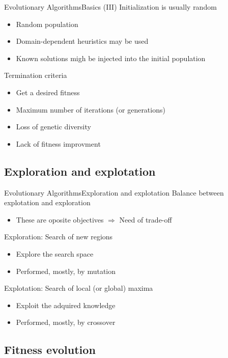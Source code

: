 \documentclass[10pt,compress]{beamer} %
\begin{document}
\begin{frame}{Evolutionary Algorithms}{Basics (III)}
	Initialization is usually random
	\begin{itemize}
		\item Random population
		\item Domain-dependent heuristics may be used
		\item Known solutions migh be injected into the initial population
	\end{itemize}
	Termination criteria
	\begin{itemize}
		\item Get a desired fitness
		\item Maximum number of iterations (or generations)
		\item Loss of genetic diversity
		\item Lack of fitness improvment
	\end{itemize}
\end{frame}

\subsection{Exploration and explotation}
\begin{frame}{Evolutionary Algorithms}{Exploration and explotation} 
	Balance between \alert{explotation} and \alert{exploration}
        \begin{itemize}
	    \item These are oposite objectives $\Rightarrow$ Need of trade-off
        \end{itemize}
	Exploration: Search of new regions%
		\begin{itemize}
		\item Explore the search space
		\item Performed, mostly, by mutation
		\end{itemize}
	Explotation: Search of local (or global) maxima%
		\begin{itemize}
		\item Exploit the adquired knowledge
		\item Performed, mostly, by crossover
		\end{itemize}
\end{frame}

\subsection{Fitness evolution}
\end{document}
